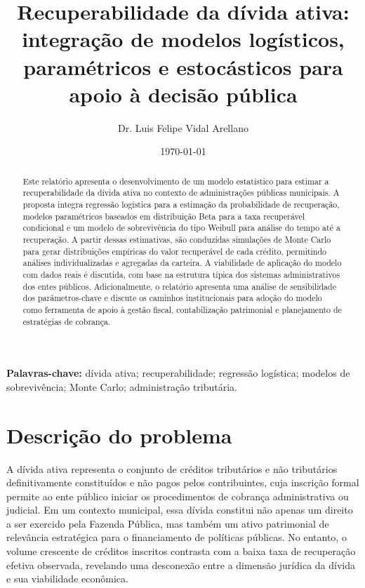 \documentclass[a4paper,12pt]{article}
\begin{document}
\title{Recuperabilidade da dívida ativa: integração de modelos logísticos, paramétricos e estocásticos para apoio à decisão pública}
\author{Dr. Luis Felipe Vidal Arellano}
\date{\today}
\maketitle

\begin{abstract}
Este relatório apresenta o desenvolvimento de um modelo estatístico para estimar a recuperabilidade da dívida ativa no contexto de administrações públicas municipais. A proposta integra regressão logística para a estimação da probabilidade de recuperação, modelos paramétricos baseados em distribuição Beta para a taxa recuperável condicional e um modelo de sobrevivência do tipo Weibull para análise do tempo até a recuperação. A partir dessas estimativas, são conduzidas simulações de Monte Carlo para gerar distribuições empíricas do valor recuperável de cada crédito, permitindo análises individualizadas e agregadas da carteira. A viabilidade de aplicação do modelo com dados reais é discutida, com base na estrutura típica dos sistemas administrativos dos entes públicos. Adicionalmente, o relatório apresenta uma análise de sensibilidade dos parâmetros-chave e discute os caminhos institucionais para adoção do modelo como ferramenta de apoio à gestão fiscal, contabilização patrimonial e planejamento de estratégias de cobrança.
\end{abstract}

\noindent\textbf{Palavras-chave:} dívida ativa; recuperabilidade; regressão logística; modelos de sobrevivência; Monte Carlo; administração tributária.

\tableofcontents
\newpage

\section{Descrição do problema}
A dívida ativa representa o conjunto de créditos tributários e não tributários definitivamente constituídos e não pagos pelos contribuintes, cuja inscrição formal permite ao ente público iniciar os procedimentos de cobrança administrativa ou judicial. Em um contexto municipal, essa dívida constitui não apenas um direito a ser exercido pela Fazenda Pública, mas também um ativo patrimonial de relevância estratégica para o financiamento de políticas públicas. No entanto, o volume crescente de créditos inscritos contrasta com a baixa taxa de recuperação efetiva observada, revelando uma desconexão entre a dimensão jurídica da dívida e sua viabilidade econômica.
\end{document}
